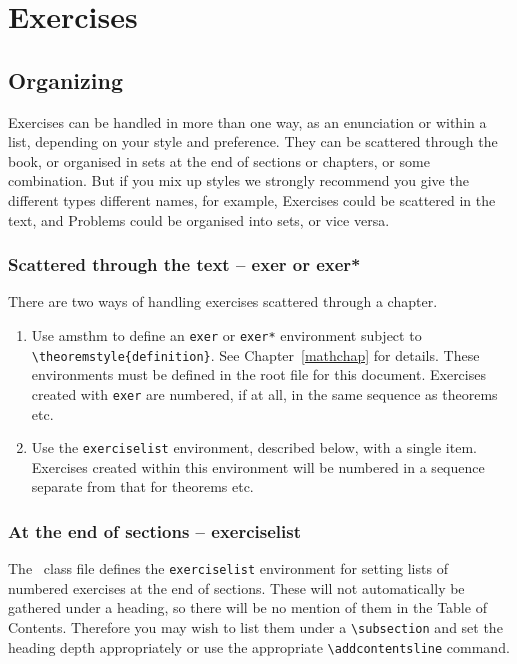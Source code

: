
\chapter{Exercises}
\label{rarities}

\section{Organizing}
Exercises can be handled
in more than one way, as an enunciation or within a list, depending on your style and preference.
They can be scattered through the book, or organised in sets at the end of sections or
chapters, or some combination. But if you mix up styles we strongly recommend
you give the different types different names, for example, Exercises could be
scattered in the text, and Problems could be organised into sets, or vice versa.

\subsection{Scattered through the text --  exer or exer*}
There are two ways of handling exercises scattered through a chapter.
\begin{enumerate}
\item Use amsthm to define an \verb"exer" or \verb"exer*" environment
subject to \verb"\theoremstyle{definition}". See Chapter~\ref{mathchap} for details.
These environments must be defined in the root file for this document.
Exercises created with \verb"exer" are numbered, if at all, in the same sequence as theorems etc.
\item Use the \verb"exerciselist" environment, described below, with a single item.
Exercises created within this environment will be numbered in a
sequence separate from that for theorems etc.

\end{enumerate}

\subsection{At the end of sections -- exerciselist}
The \cambridge\ class file defines the \verb"exerciselist" environment
for setting lists of numbered exercises at the end of sections. These
will not automatically be gathered under a heading, so there will be no  mention of them
in the Table of Contents. Therefore you may wish to list them under a \verb"\subsection"
and set the heading depth appropriately or use the
appropriate \verb"\addcontentsline" command.

